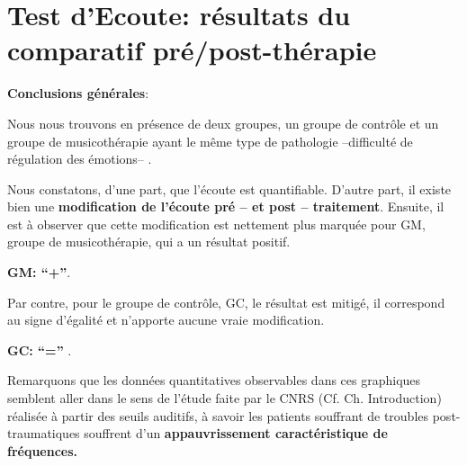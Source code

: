  

\section*{Test d'Ecoute: résultats du comparatif pré/post-thérapie}

\textbf{Conclusions générales}:

             Nous nous trouvons
           en présence de deux groupes, un groupe de contrôle et un
           groupe de musicothérapie ayant le même type de
           pathologie --difficulté de régulation des émotions-- .


Nous constatons, d'une part, que l'écoute est quantifiable.
           D'autre part, il existe bien
          une \textbf{modification de l'écoute pré -- et post -- traitement}.
Ensuite, il est à observer que
          cette modification est nettement plus marquée
          pour GM, groupe de musicothérapie, qui a un résultat positif.


          \textbf{GM: ``+''}.


Par contre,  pour le groupe de contrôle, GC, le résultat est mitigé, il correspond au signe d'égalité et n'apporte aucune vraie modification.

          \textbf{GC:  ``='' }.


        Remarquons que les données quantitatives observables dans ces graphiques semblent aller dans le
sens de  l'étude faite par le
CNRS (Cf. Ch. Introduction) \autocite{affectiveDisorders} réalisée à partir des seuils auditifs, à savoir
les patients souffrant de troubles post-traumatiques souffrent d'un
\textbf{appauvrissement caractéristique de fréquences.}

